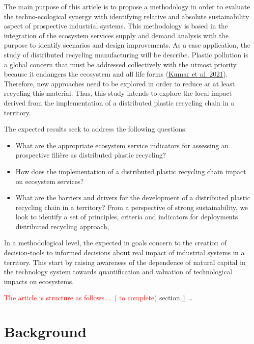 \documentclass[
]{article}
\providecommand{\tightlist}{%
  \setlength{\itemsep}{0pt}\setlength{\parskip}{0pt}}
\def\tightlist{}
\begin{document}
The main purpose of this article is to propose a methodology in order to evaluate the techno-ecological synergy with identifying relative and absolute sustainability aspect of prospective industrial systems.
This methodology is based in the integration of the ecosystem services supply and demand analysis with the purpose to identify scenarios and design improvements.
As a case application, the study of distributed recycling manufacturing will be describe.
Plastic pollution is a global concern that must be addressed collectively with the utmost priority because it endangers the ecosystem and all life forms (\protect\hyperlink{ref-Kumar2021}{Kumar et al. 2021}).
Therefore, new approaches need to be explored in order to reduce ar at least recycling this material.
Thus, this study intends to explore the local impact derived from the implementation of a distributed plastic recycling chain in a territory.

The expected results seek to address the following questions:

\begin{itemize}
\tightlist
\item
  What are the appropriate ecosystem service indicators for assessing an prospective filière as distributed plastic recycling?
\item
  How does the implementation of a distributed plastic recycling chain impact on ecosystem services?
\item
  What are the barriers and drivers for the development of a distributed plastic recycling chain in a territory?
  From a perspective of strong sustainability, we look to identify a set of principles, criteria and indicators for deployments distributed recycling approach,
\end{itemize}

In a methodological level, the expected in goals concern to the creation of decision-tools to informed decisions about real impact of industrial systems in a territory.
This start by raising awareness of the dependence of natural capital in the technology system towards quantification and valuation of technological impacts on ecosystems.

\textcolor{red}{The article is structure as follows.... ( to complete) } section \ref{background} \ldots{}

\hypertarget{background}{%
\section{Background}\label{background}}
\end{document}
